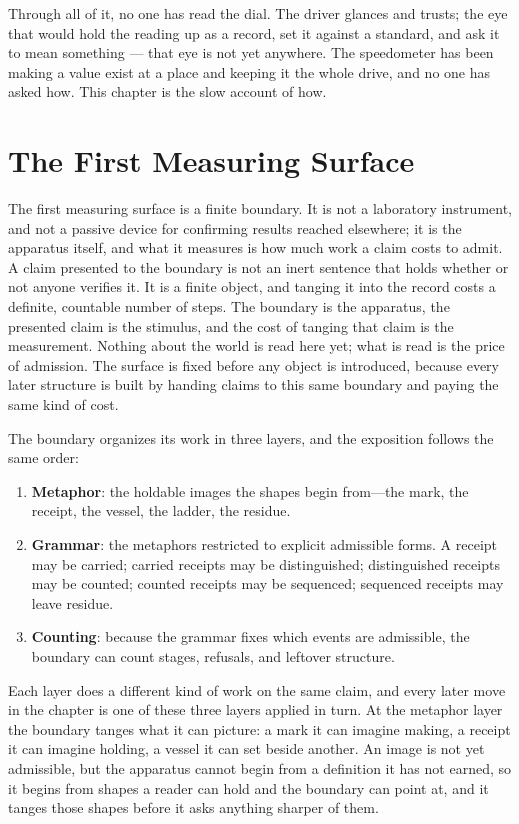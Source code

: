 Through all of it, no one has read the dial. The driver glances and trusts; the eye that would hold the reading up as a record, set it against a standard, and ask it to mean something --- that eye is not yet anywhere. The speedometer has been making a value exist at a place and keeping it the whole drive, and no one has asked how. This chapter is the slow account of how.

\section{The First Measuring Surface}

The first measuring surface is a finite boundary. It is not a laboratory instrument, and not a passive device for confirming results reached elsewhere; it is the apparatus itself, and what it measures is how much work a claim costs to admit. A claim presented to the boundary is not an inert sentence that holds whether or not anyone verifies it. It is a finite object, and tanging it into the record costs a definite, countable number of steps. The boundary is the apparatus, the presented claim is the stimulus, and the cost of tanging that claim is the measurement. Nothing about the world is read here yet; what is read is the price of admission. The surface is fixed before any object is introduced, because every later structure is built by handing claims to this same boundary and paying the same kind of cost.

The boundary organizes its work in three layers, and the exposition follows the same order:
\begin{enumerate}
    \item \textbf{Metaphor}: the holdable images the shapes begin from---the mark, the receipt, the vessel, the ladder, the residue.
    \item \textbf{Grammar}: the metaphors restricted to explicit admissible forms. A receipt may be carried; carried receipts may be distinguished; distinguished receipts may be counted; counted receipts may be sequenced; sequenced receipts may leave residue.
    \item \textbf{Counting}: because the grammar fixes which events are admissible, the boundary can count stages, refusals, and leftover structure.
\end{enumerate}

Each layer does a different kind of work on the same claim, and every later move in the chapter is one of these three layers applied in turn. At the metaphor layer the boundary tanges what it can picture: a mark it can imagine making, a receipt it can imagine holding, a vessel it can set beside another. An image is not yet admissible, but the apparatus cannot begin from a definition it has not earned, so it begins from shapes a reader can hold and the boundary can point at, and it tanges those shapes before it asks anything sharper of them.

